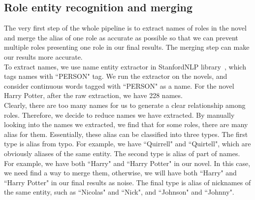 \documentclass[11pt]{article}
\begin{document}
\subsection{Role entity recognition and merging} %

The very first step of the whole pipeline is to extract names of roles in the novel and merge the alias of one role as accurate as possible so that we can prevent multiple roles presenting one role in our final results. The merging step can make our results more accurate. \\

To extract names, we use name entity extractor in StanfordNLP library~\cite{stanfordnlp}, which tags names with ``PERSON" tag. We run the extractor on the novels, and consider continuous words tagged with ``PERSON" as a name. For the novel Harry Potter, after the raw extraction, we have 228 names. \\

Clearly, there are too many names for us to generate a clear relationship among roles. Therefore, we decide to reduce names we have extracted. By manually looking into the names we extracted, we find that for some roles, there are many alias for them. Essentially, these alias can be classified into three types. The first type is alias from typo. For example, we have ``Quirrell" and ``Quirtell", which are obviously aliases of the same entity. The second type is alias of part of names. For example, we have both ``Harry" and ``Harry Potter" in our novel. In this case, we need find a way to merge them, otherwise, we will have both ``Harry" and ``Harry Potter" in our final results as noise. The final type is alias of nicknames of the same entity, such as ``Nicolas" and ``Nick", and ``Johnson" and ``Johnny". \\
\end{document}
